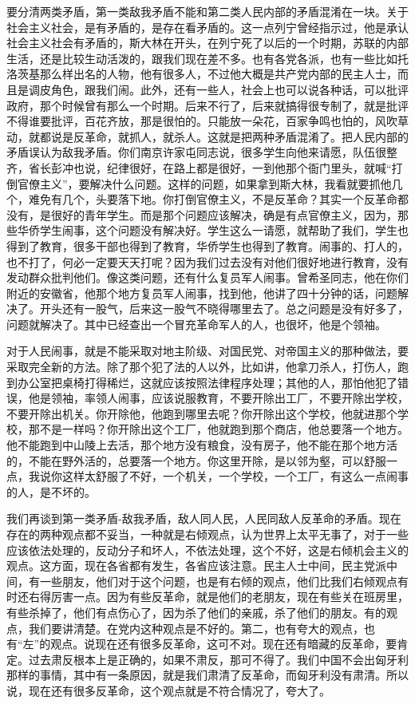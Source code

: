 要分清两类矛盾，第一类敌我矛盾不能和第二类人民内部的矛盾混淆在一块。关于社会主义社会，是有矛盾的，是存在看矛盾的。这一点列宁曾经指示过，他是承认社会主义社会有矛盾的，斯大林在开头，在列宁死了以后的一个时期，苏联的内部生活，还是比较生动活泼的，跟我们现在差不多。也有各党各派，也有一些比如托洛茨基那么样出名的人物，他有很多人，不过他大概是共产党内部的民主人士，而且是调皮角色，跟我们闹。此外，还有一些人，社会上也可以说各种话，可以批评政府，那个时候曾有那么一个时期。后来不行了，后来就搞得很专制了，就是批评不得谁要批评，百花齐放，那是很怕的。只能放一朵花，百家争鸣也怕的，风吹草动，就都说是反革命，就抓人，就杀人。这就是把两种矛盾混淆了。把人民内部的矛盾误认为敌我矛盾。你们南京许家屯同志说，很多学生向他来请愿，队伍很整齐，省长彭冲也说，纪律很好，在路上都是很好，一到他那个衙门里头，就喊“打倒官僚主义”，要解决什么问题。这样的问题，如果拿到斯大林，我看就要抓他几个，难免有几个，头要落下地。你打倒官僚主义，不是反革命？其实一个反革命都没有，是很好的青年学生。而是那个问题应该解决，确是有点官僚主义，因为，那些华侨学生闹事，这个问题没有解决好。学生这么一请愿，就帮助了我们，学生也得到了教育，很多干部也得到了教育，华侨学生也得到了教育。闹事的、打人的，也不打了，何必一定要天天打呢？因为我们过去没有对他们很好地进行教育，没有发动群众批判他们。像这类问题，还有什么复员军人闹事。曾希圣同志，他在你们附近的安徽省，他那个地方复员军人闹事，找到他，他讲了四十分钟的话，问题解决了。开头还有一股气，后来这一股气不晓得哪里去了。总之问题是没有好多了，问题就解决了。其中已经查出一个冒充革命军人的人，也很坏，他是个领袖。

对于人民闹事，就是不能采取对地主阶级、对国民党、对帝国主义的那种做法，要采取完全新的方法。除了那个犯了法的人以外，比如讲，他拿刀杀人，打伤人，跑到办公室把桌椅打得稀烂，这就应该按照法律程序处理；其他的人，那怕他犯了错误，他是领袖，率领人闹事，应该说服教育，不要开除出工厂，不要开除出学校，不要开除出机关。你开除他，他跑到哪里去呢？你开除出这个学校，他就进那个学校，那不是一样吗？你开除出这个工厂，他就跑到那个商店，他总要落一个地方。他不能跑到中山陵上去活，那个地方没有粮食，没有房子，他不能在那个地方活的，不能在野外活的，总要落一个地方。你这里开除，是以邻为壑，可以舒服一点，我说你这样太舒服了不好，一个机关，一个学校，一个工厂，有这么一点闹事的人，是不坏的。

我们再谈到第一类矛盾-敌我矛盾，敌人同人民，人民同敌人反革命的矛盾。现在存在的两种观点都不妥当，一种就是右倾观点，认为世界上太平无事了，对于一些应该依法处理的，反动分子和坏人，不依法处理，这个不好，这是右倾机会主义的观点。这方面，现在各省都有发生，各省应该注意。民主人士中间，民主党派中间，有一些朋友，他们对于这个问题，也是有右倾的观点，他们比我们右倾观点有时还右得厉害一点。因为有些反革命，就是他们的老朋友，现在有些关在班房里，有些杀掉了，他们有点伤心了，因为杀了他们的亲戚，杀了他们的朋友。有的观点，我们要讲清楚。在党内这种观点是不好的。第二，也有夸大的观点，也有“左”的观点。说现在还有很多反革命，这可不对。现在还有暗藏的反革命，要肯定。过去肃反根本上是正确的，如果不肃反，那可不得了。我们中国不会出匈牙利那样的事情，其中有一条原因，就是我们肃清了反革命，而匈牙利没有肃清。所以说，现在还有很多反革命，这个观点就是不符合情况了，夸大了。


